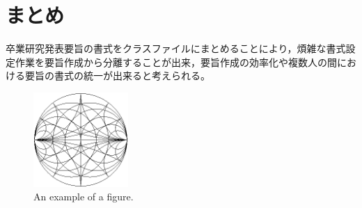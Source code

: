 \documentclass{kandasummary}
\begin{document}
\section{まとめ}
卒業研究発表要旨の書式をクラスファイルにまとめることにより，煩雑な書式設定作業を要旨作成から分離することが出来，要旨作成の効率化や複数人の間における要旨の書式の統一が出来ると考えられる。


\begin{figure}[b]
\centering
\includegraphics[width=0.32\textwidth]{smithchart.eps}
\caption{An example of a figure.}
\label{fig:ex}
\end{figure}
\end{document}
